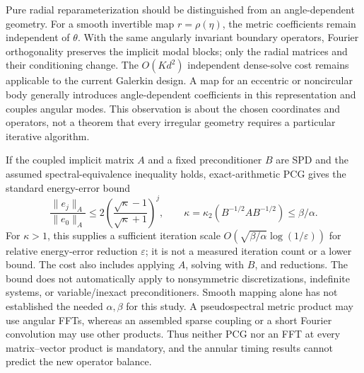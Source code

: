 Pure radial reparameterization should be distinguished from an angle-dependent geometry. For a smooth invertible map $r=\rho(\eta)$, the metric coefficients remain independent of $\theta$. With the same angularly invariant boundary operators, Fourier orthogonality preserves the implicit modal blocks; only the radial matrices and their conditioning change. The $O(Kd^2)$ independent dense-solve cost remains applicable to the current Galerkin design. A map for an eccentric or noncircular body generally introduces angle-dependent coefficients in this representation and couples angular modes. This observation is about the chosen coordinates and operators, not a theorem that every irregular geometry requires a particular iterative algorithm.

If the coupled implicit matrix $A$ and a fixed preconditioner $B$ are SPD and the assumed spectral-equivalence inequality holds, exact-arithmetic PCG gives the standard energy-error bound\cite{r21}
\begin{equation}
 \frac{\|e_j\|_A}{\|e_0\|_A}
 \leq2\left(\frac{\sqrt{\kappa}-1}{\sqrt{\kappa}+1}\right)^j,
 \qquad \kappa=\kappa_2(B^{-1/2}AB^{-1/2})\leq\beta/\alpha.
 \label{eq:geometry-pcg-bound}
\end{equation}
For $\kappa>1$, this supplies a sufficient iteration scale $O(\sqrt{\beta/\alpha}\log(1/\varepsilon))$ for relative energy-error reduction $\varepsilon$; it is not a measured iteration count or a lower bound. The cost also includes applying $A$, solving with $B$, and reductions. The bound does not automatically apply to nonsymmetric discretizations, indefinite systems, or variable/inexact preconditioners. Smooth mapping alone has not established the needed $\alpha,\beta$ for this study. A pseudospectral metric product may use angular FFTs, whereas an assembled sparse coupling or a short Fourier convolution may use other products. Thus neither PCG nor an FFT at every matrix--vector product is mandatory, and the annular timing results cannot predict the new operator balance.
